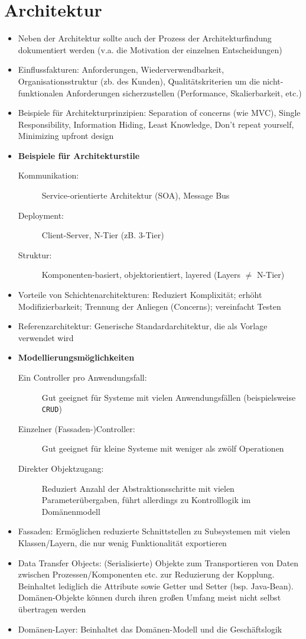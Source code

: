 \section{Architektur}
\begin{itemize}
	\item Neben der Architektur sollte auch der Prozess der Architekturfindung dokumentiert werden (v.a. die Motivation der einzelnen Entscheidungen)
	\item Einflussfakturen: Anforderungen, Wiederverwendbarkeit, Organisationsstruktur (zb. des Kunden), Qualitätskriterien um die nicht-funktionalen Anforderungen sicherzustellen (Performance, Skalierbarkeit, etc.)
	\item Beispiele für Architekturprinzipien: Separation of concerns (wie MVC), Single Responsibility, Information Hiding, Least Knowledge, Don't repeat yourself, Minimizing upfront design
	\item \textbf{Beispiele für Architekturstile}
	\begin{description}
		\item[Kommunikation:] Service-orientierte Architektur (SOA), Message Bus
		\item[Deployment:] Client-Server, N-Tier (zB. 3-Tier)
		\item[Struktur:] Komponenten-basiert, objektorientiert, layered (Layers \(\neq\) N-Tier)
	\end{description}
	\item Vorteile von Schichtenarchitekturen: Reduziert Komplixität; erhöht Modifizierbarkeit; Trennung der Anliegen (Concerns); vereinfacht Testen
	\item Referenzarchitektur: Generische Standardarchitektur, die als Vorlage verwendet wird
	\item \textbf{Modellierungsmöglichkeiten}
	\begin{description}
		\item[Ein Controller pro Anwendungsfall:] Gut geeignet für Systeme mit vielen Anwendungsfällen (beispielsweise \texttt{CRUD})
		\item[Einzelner (Fassaden-)Controller:] Gut geeignet für kleine Systeme mit weniger als zwölf Operationen
		\item[Direkter Objektzugang:] Reduziert Anzahl der Abstraktionsschritte mit vielen Parameterübergaben, führt allerdings zu Kontrolllogik im Domänenmodell
	\end{description}
	\item Fassaden: Ermöglichen reduzierte Schnittstellen zu Subsystemen mit vielen Klassen/Layern, die nur wenig Funktionalität exportieren
	\item Data Transfer Objects: (Serialisierte) Objekte zum Transportieren von Daten zwischen Prozessen/Komponenten etc. zur Reduzierung der Kopplung. Beinhaltet lediglich die Attribute sowie Getter und Setter (bsp. Java-Bean). Domänen-Objekte können durch ihren großen Umfang meist nicht selbst übertragen werden
	\item Domänen-Layer: Beinhaltet das Domänen-Modell und die Geschäftslogik
\end{itemize}



